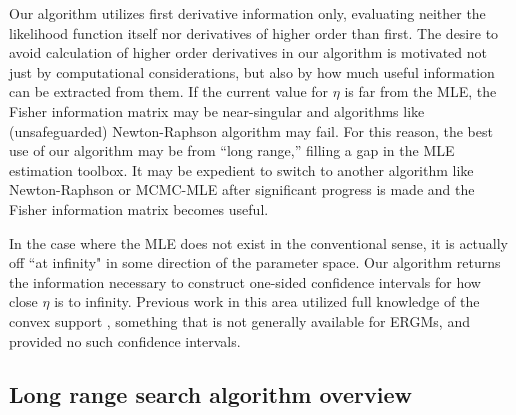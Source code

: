 Our algorithm utilizes first derivative information only, evaluating 
neither the likelihood function itself nor derivatives of higher order than first.
The desire to avoid calculation of higher order derivatives in our algorithm
is motivated not just by 
computational considerations, but 
also by how much useful information can be extracted from them.   
If the current value for $\eta$ is far from the MLE,  
the Fisher information matrix may be near-singular and algorithms like (unsafeguarded) 
Newton-Raphson algorithm may fail.  
For this 
reason, the best use of our algorithm may be from ``long range,'' filling a gap in the MLE estimation toolbox.  It may 
be expedient to switch to another algorithm like Newton-Raphson or MCMC-MLE 
after significant progress is made and the Fisher information matrix becomes useful.  

In the case where the MLE does not exist in the conventional sense, 
it is actually off ``at infinity" in some direction of the parameter space.
Our algorithm returns the information necessary to construct one-sided confidence 
intervals for how close $\eta$ is to infinity.  
Previous work in this area utilized full knowledge
of the convex support \citep{Handcock:degeneracy,Rinaldo:2009}, something
that is not generally available for ERGMs, and provided no such confidence intervals.



\subsection{Long range search algorithm overview}  \label{S:algorithm overview}

